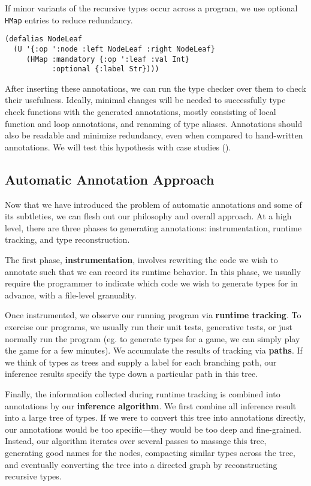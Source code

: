 \documentclass[9pt]{extarticle}
\begin{document}
If minor variants of the recursive types occur
across a program,
we use optional \texttt{HMap} entries %
to reduce redundancy.
%
\begin{Verbatim}
(defalias NodeLeaf 
  (U '{:op ':node :left NodeLeaf :right NodeLeaf}
     (HMap :mandatory {:op ':leaf :val Int}
           :optional {:label Str})))
\end{Verbatim}
%
After inserting these annotations, we can run the
type checker over them to check their usefulness.
Ideally, minimal changes will be needed to successfully type check
functions with the generated annotations,
mostly consisting of local function and loop annotations,
and renaming of type aliases.
Annotations should also be readable and minimize
redundancy, even when compared to hand-written annotations.
We will test this hypothesis with case studies
().

\subsection{Automatic Annotation Approach}

Now that we have introduced the problem of automatic annotations and some
of its subtleties, we can flesh out our philosophy and overall approach.
At a high level, there are three phases to
generating annotations: instrumentation, runtime tracking, and type reconstruction.

The first phase, \textbf{instrumentation}, involves
rewriting the code we wish to annotate such
that we can record its runtime behavior.
In this phase, we usually require the programmer to
indicate which code we wish to generate types
for in advance, with a file-level granuality.

Once instrumented, we observe our running program
via \textbf{runtime tracking}. To exercise our programs,
we usually run their unit tests, generative tests,
or just normally run the program (eg. to generate types for
a game, we can simply play the game for a few minutes).
We accumulate the results of tracking via \textbf{paths}.
If we think of types as trees and supply a label
for each branching path, our inference results
specify the type down a particular path in this tree.

Finally, the information collected during runtime tracking
is combined into annotations by our \textbf{inference algorithm}.
We first combine all inference result into a large tree of
types. If we were to convert this tree into annotations directly,
our annotations would be too specific---they would be too
deep and fine-grained.
Instead, our algorithm iterates over several passes to massage
this tree, generating good names for the nodes, compacting similar
types across the tree, and
eventually converting the tree into a directed graph by reconstructing
recursive types.
\end{document}
